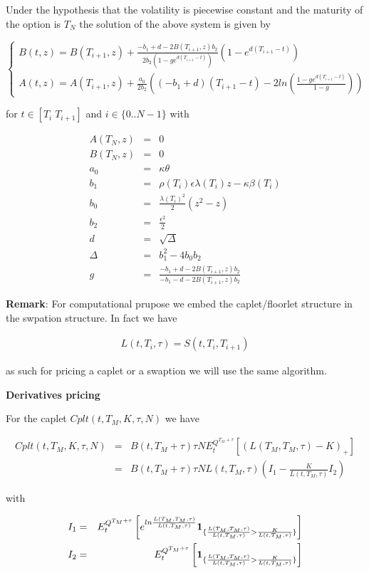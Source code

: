 \documentclass[10pt,a4paper,english,landscape]{slides}
\newcommand{\ban}{\begin{eqnarray*}}
\newcommand{\ean}{\end{eqnarray*}}
\begin{document}
Under the hypothesis that the volatility is piecewise constant and the maturity of the option is $T_N$ the solution of the above system is given by

\[
\left\lbrace 
\begin{array}{l}
B(t,z)=B(T_{i+1},z)+\frac{-b_1+d-2B(T_{i+1},z)b_2}{2b_2(1-ge^{d(T_{i+1}-t)})}(1-e^{d(T_{i+1}-t)})\\
A(t,z)=A(T_{i+1},z)+\frac{a_0}{2b_2}\left(  (-b_1+d)(T_{i+1}-t)-2ln\left(\frac{1-ge^{d(T_{i+1}-t)}}{1-g} \right)   \right)
\end{array}
\right. 
\]

for $t\in [T_i\; T_{i+1}]$ and $i \in \lbrace 0..N-1 \rbrace $ with 

\ban
A(T_N,z)&=&0\\
B(T_N,z)&=&0\\
a_0&=&\kappa \theta\\
b_1&=&\rho(T_i) \epsilon \lambda(T_i) z -\kappa \beta(T_i) \\
b_0&=&\frac{\lambda(T_i)^2}{2}(z^2-z)\\
b_2&=&\frac{\epsilon^2}{2}\\
d&=&\sqrt{\Delta}\\
\Delta&=&b_1^2-4b_0b_2\\
g&=&\frac{-b_1+d -2 B(T_{i+1},z)b_2}{-b_1-d -2 B(T_{i+1},z)b_2} 
\ean


{\bf Remark}: For computational prupose we embed the caplet/floorlet structure in the swpation structure. In fact we have


\ban
L(t,T_i,\tau)=S(t,T_i,T_{i+1})
\ean

as such for pricing a caplet or a swaption we will use the same algorithm.

{\bf Derivatives pricing}

For the caplet $Cplt(t,T_M,K,\tau,N)$ we have

\ban
Cplt(t,T_M,K,\tau,N)&=&B(t,T_M+\tau)\tau N E^{Q^{T_M+\tau}}_t[(L(T_M,T_M,\tau)-K)_+]\\
&=&B(t,T_M+\tau)\tau N L(t,T_M,\tau) \left( I_1 - \frac{K}{L(t,T_M,\tau)}I_2 \right)
\ean

with

\ban
I_1&=&E^{Q^{T_M+\tau }}_t\left[ e^{ln\frac{L(T_M,T_M,\tau)}{L(t,T_M,\tau)}} {\bf 1}_{\lbrace \frac{L(T_M,T_M,\tau)}{L(t,T_M,\tau)}>\frac{K}{L(t,T_M,\tau)} \rbrace } \right]\\
I_2&=&E^{Q^{T_M+\tau }}_t\left[  {\bf 1}_{ \lbrace \frac{L(T_M,T_M,\tau)}{L(t,T_M,\tau)}>\frac{K}{L(t,T_M,\tau)} \rbrace }\right]
\ean
\end{document}
